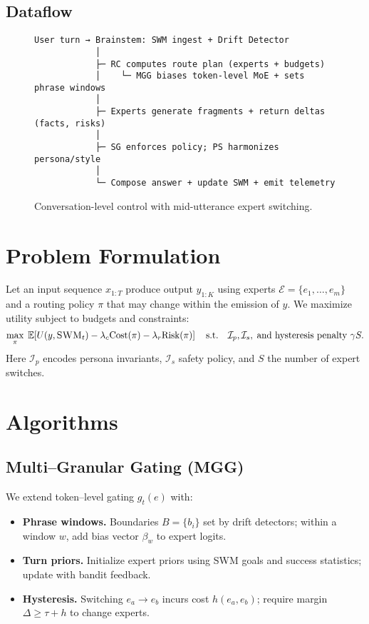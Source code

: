 \documentclass[11pt]{article}
\newcommand{\SWM}{\textsc{SWM}}
\newcommand{\E}{\mathbb{E}}
\begin{document}
\subsection{Dataflow}
\begin{figure}[h]
\centering
\begin{minipage}{0.95\linewidth}
\small
\begin{verbatim}
User turn → Brainstem: SWM ingest + Drift Detector
            │
            ├─ RC computes route plan (experts + budgets)
            │    └─ MGG biases token-level MoE + sets phrase windows
            │
            ├─ Experts generate fragments + return deltas (facts, risks)
            │
            ├─ SG enforces policy; PS harmonizes persona/style
            │
            └─ Compose answer + update SWM + emit telemetry
\end{verbatim}
\end{minipage}
\caption{Conversation-level control with mid-utterance expert switching.}
\end{figure}

\section{Problem Formulation}
Let an input sequence $x_{1:T}$ produce output $y_{1:K}$ using experts $\mathcal{E}=\{e_1,\dots,e_m\}$ and a routing policy $\pi$ that may change within the emission of $y$.
We maximize utility subject to budgets and constraints:
\begin{equation}
\max_{\pi} \; \E\!\left[ U(y,\SWM_t) - \lambda_c \mathrm{Cost}(\pi) - \lambda_r \mathrm{Risk}(\pi) \right]
\quad \text{s.t.} \quad \mathcal{I}_p, \mathcal{I}_s, \; \text{and hysteresis penalty } \gamma S.
\end{equation}
Here $\mathcal{I}_p$ encodes persona invariants, $\mathcal{I}_s$ safety policy, and $S$ the number of expert switches.

\section{Algorithms}
\subsection{Multi--Granular Gating (MGG)}
We extend token--level gating $g_t(e)$ with:
\begin{itemize}[leftmargin=*,itemsep=2pt,topsep=2pt]
\item \textbf{Phrase windows.} Boundaries $B=\{b_i\}$ set by drift detectors; within a window $w$, add bias vector $\beta_w$ to expert logits.
\item \textbf{Turn priors.} Initialize expert priors using \SWM{} goals and success statistics; update with bandit feedback.
\item \textbf{Hysteresis.} Switching $e_a \to e_b$ incurs cost $h(e_a,e_b)$; require margin $\Delta \ge \tau + h$ to change experts.
\end{itemize}
\end{document}
